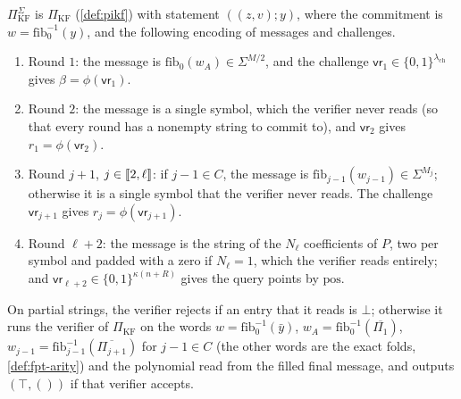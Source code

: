 \begin{definition}\label{def:pikf-sigma}
$\Pi^\Sigma_{\mathrm{KF}}$ is $\Pi_{\mathrm{KF}}$ (\cref{def:pikf}) with statement $((z,v); y)$, where the commitment is $w = \mathrm{fib}_0^{-1}(y)$, and the following encoding of messages and challenges.
\begin{enumerate}
  \item Round $1$: the message is $\mathrm{fib}_0(w_A) \in \Sigma^{M/2}$, and the challenge $\mathsf{vr}_1 \in \{0,1\}^{\lambda_{\mathrm{ch}}}$ gives $\beta = \phi(\mathsf{vr}_1)$.
  \item Round $2$: the message is a single symbol, which the verifier never reads (so that every round has a nonempty string to commit to), and $\mathsf{vr}_2$ gives $r_1 = \phi(\mathsf{vr}_2)$.
  \item Round $j+1$, $j \in \llbracket 2, \ell \rrbracket$: if $j-1 \in C$, the message is $\mathrm{fib}_{j-1}(w_{j-1}) \in \Sigma^{M_j}$; otherwise it is a single symbol that the verifier never reads. The challenge $\mathsf{vr}_{j+1}$ gives $r_j = \phi(\mathsf{vr}_{j+1})$.
  \item Round $\ell+2$: the message is the string of the $N_\ell$ coefficients of $P$, two per symbol and padded with a zero if $N_\ell = 1$, which the verifier reads entirely; and $\mathsf{vr}_{\ell+2} \in \{0,1\}^{\kappa(n+R)}$ gives the query points by $\mathrm{pos}$.
\end{enumerate}
On partial strings, the verifier rejects if an entry that it reads is $\bot$; otherwise it runs the verifier of $\Pi_{\mathrm{KF}}$ on the words $w = \mathrm{fib}_0^{-1}(\bar y)$, $w_A = \mathrm{fib}_0^{-1}(\overline{\Pi_1})$, $w_{j-1} = \mathrm{fib}_{j-1}^{-1}(\overline{\Pi_{j+1}})$ for $j-1 \in C$ (the other words are the exact folds, \cref{def:fpt-arity}) and the polynomial read from the filled final message, and outputs $(\top, ())$ if that verifier accepts.
\end{definition}

